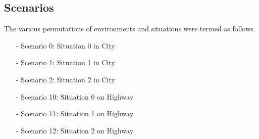 \documentclass[journal]{IEEEtran}
\begin{document}
\subsection{Scenarios}
The various permutations of environments and situations were termed as follows.
\begin{itemize}
	\item[-] Scenario 0: Situation 0 in City
	\item[-] Scenario 1: Situation 1 in City
	\item[-] Scenario 2: Situation 2 in City
	\item[-] Scenario 10: Situation 0 on Highway
	\item[-] Scenario 11: Situation 1 on Highway
	\item[-] Scenario 12: Situation 2 on Highway
\end{itemize}
\end{document}
